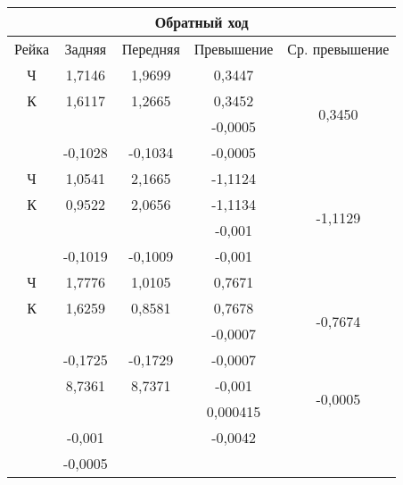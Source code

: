 \documentclass[a4paper]{article}
\begin{document}
\begin{newpage}
\begin{center}
{\begin{tabular}{|c|c|c|c|c|}
\multicolumn{5}{|c|}{Обратный ход}\\
\hline
Рейка & Задняя & Передняя & Превышение & Ср. превышение\\
\hline
Ч & 1,7146  & 1,9699  & 0,3447  & \multirow{4}{*}{0,3450}\\
\cline{1-4}
К & 1,6117  & 1,2665  & 0,3452 & \\
\cline{1-4}
  &         &         & -0,0005 & \\
  & -0,1028 & -0,1034 & -0,0005 & \\
\hline
Ч & 1,0541  & 2,1665  & -1,1124 & \multirow{4}{*}{-1,1129}\\
\cline{1-4}
К & 0,9522  & 2,0656  & -1,1134 & \\
\cline{1-4}
  &         &         & -0,001  & \\
  & -0,1019 & -0,1009 & -0,001  & \\
\hline
Ч & 1,7776 & 1,0105   & 0,7671  & \multirow{4}{*}{-0,7674}\\
\cline{1-4}
К & 1,6259 & 0,8581   & 0,7678  & \\
\cline{1-4}
  &         &         & -0,0007 & \\
  & -0,1725 & -0,1729 & -0,0007 & \\
\hline
  & 8,7361  & 8,7371  & -0,001  & \multirow{2}{*}{-0,0005}\\
  &         &         & 0,000415& \\
\hline
  & -0,001 &         & -0,0042  & \\
  & -0,0005&         &          & \\
\hline
\end{tabular}
}
\end{center}
\end{newpage}
\end{document}
